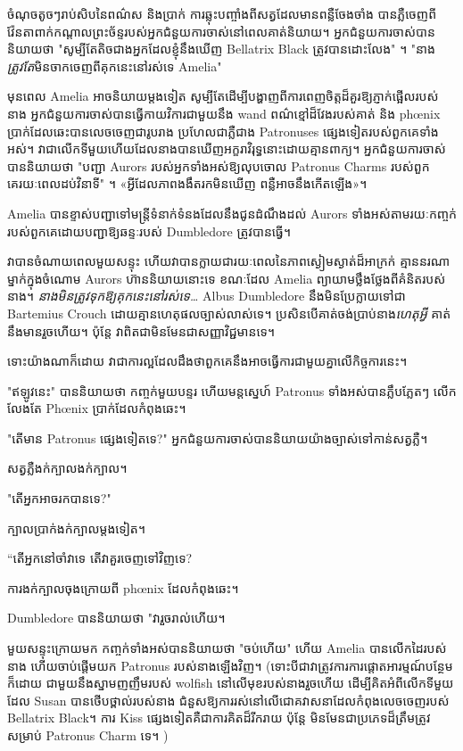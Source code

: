 ចំណុចតូចៗរាប់សិបនៃពណ៌ស និងប្រាក់ ការឆ្លុះបញ្ចាំងពីសត្វដែលមានពន្លឺចែងចាំង បានភ្លឺចេញពីវ៉ែនតាពាក់កណ្តាលព្រះច័ន្ទរបស់អ្នកជំនួយការចាស់នៅពេលគាត់និយាយ។ អ្នកជំនួយការចាស់បាននិយាយថា "សូម្បីតែតិចជាងអ្នកដែលខ្ញុំនឹងឃើញ Bellatrix Black ត្រូវបានដោះលែង" ។ "នាង\emph{ត្រូវតែ}មិនចាកចេញពីគុកនេះនៅរស់ទេ Amelia"

មុនពេល Amelia អាចនិយាយម្តងទៀត សូម្បីតែដើម្បីបង្ហាញពីការពេញចិត្តដ៏គួរឱ្យភ្ញាក់ផ្អើលរបស់នាង អ្នកជំនួយការចាស់បានធ្វើកាយវិការជាមួយនឹង wand ពណ៌ខ្មៅដ៏វែងរបស់គាត់ និង phœnix ប្រាក់ដែលឆេះបានលេចចេញជារូបរាង ប្រហែលជាភ្លឺជាង Patronuses ផ្សេងទៀតរបស់ពួកគេទាំងអស់។ វាជាលើកទីមួយហើយដែលនាងបានឃើញអក្ខរាវិរុទ្ធនោះដោយគ្មានពាក្យ។ អ្នកជំនួយការចាស់បាននិយាយថា "បញ្ជា Aurors របស់អ្នកទាំងអស់ឱ្យលុបចោល Patronus Charms របស់ពួកគេរយៈពេលដប់វិនាទី" ។ «​អ្វី​ដែល​ភាព​ងងឹត​រក​មិន​ឃើញ ពន្លឺ​អាច​នឹង​កើត​ឡើង​»។

Amelia បានខ្ទាស់បញ្ជាទៅមន្រ្តីទំនាក់ទំនងដែលនឹងជូនដំណឹងដល់ Aurors ទាំងអស់តាមរយៈកញ្ចក់របស់ពួកគេដោយបញ្ជាឱ្យឆន្ទៈរបស់ Dumbledore ត្រូវបានធ្វើ។

វាបានចំណាយពេលមួយសន្ទុះ ហើយវាបានក្លាយជារយៈពេលនៃភាពស្ងៀមស្ងាត់ដ៏អាក្រក់ គ្មាននរណាម្នាក់ក្នុងចំណោម Aurors ហ៊ាននិយាយនោះទេ ខណៈដែល Amelia ព្យាយាមថ្លឹងថ្លែងពីគំនិតរបស់នាង។ \emph{នាងមិនត្រូវទុកឱ្យគុកនេះនៅរស់ទេ…} Albus Dumbledore នឹងមិនប្រែក្លាយទៅជា Bartemius Crouch ដោយគ្មានហេតុផលច្បាស់លាស់ទេ។ ប្រសិនបើគាត់ចង់ប្រាប់នាង\emph{ហេតុអ្វី} គាត់នឹងមានរួចហើយ។ ប៉ុន្តែ វា​ពិត​ជា​មិន​មែន​ជា​សញ្ញា​វិជ្ជមាន​ទេ។

ទោះយ៉ាងណាក៏ដោយ វាជាការល្អដែលដឹងថាពួកគេនឹងអាចធ្វើការជាមួយគ្នាលើកិច្ចការនេះ។

"ឥឡូវនេះ" បាននិយាយថា កញ្ចក់មួយបន្ទរ ហើយមន្តស្នេហ៍ Patronus ទាំងអស់បានភ្លឹបភ្លែតៗ លើកលែងតែ Phœnix ប្រាក់ដែលកំពុងឆេះ។

"តើមាន Patronus ផ្សេងទៀតទេ?" អ្នកជំនួយការចាស់បាននិយាយយ៉ាងច្បាស់ទៅកាន់សត្វភ្លឺ។

សត្វ​ភ្លឺ​ងក់​ក្បាល​ងក់​ក្បាល។

"តើអ្នកអាចរកបានទេ?"

ក្បាលប្រាក់ងក់ក្បាលម្តងទៀត។

“តើ​អ្នក​នៅ​ចាំ​វា​ទេ តើ​វា​គួរ​ចេញ​ទៅ​វិញ​ទេ?

ការងក់ក្បាលចុងក្រោយពី phœnix ដែលកំពុងឆេះ។

Dumbledore បាននិយាយថា "វារួចរាល់ហើយ។

មួយសន្ទុះក្រោយមក កញ្ចក់ទាំងអស់បាននិយាយថា "ចប់ហើយ" ហើយ Amelia បានលើកដៃរបស់នាង ហើយចាប់ផ្តើមយក Patronus របស់នាងឡើងវិញ។ (ទោះបីជាវាត្រូវការការផ្តោតអារម្មណ៍បន្ថែមក៏ដោយ ជាមួយនឹងស្នាមញញឹមរបស់ wolfish នៅលើមុខរបស់នាងរួចហើយ ដើម្បីគិតអំពីលើកទីមួយដែល Susan បានថើបថ្ពាល់របស់នាង ជំនួសឱ្យការរស់នៅលើជោគវាសនាដែលកំពុងលេចចេញរបស់ Bellatrix Black។ ការ Kiss ផ្សេងទៀតគឺជាការគិតដ៏រីករាយ ប៉ុន្តែ មិនមែនជាប្រភេទដ៏ត្រឹមត្រូវសម្រាប់ Patronus Charm ទេ។ )

